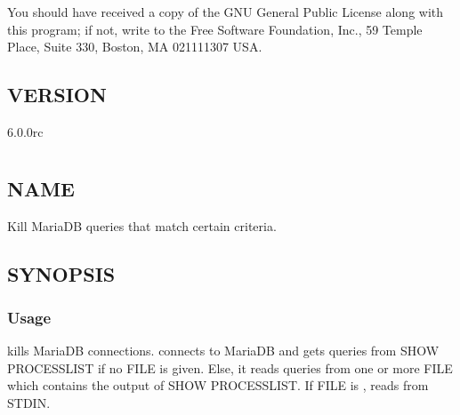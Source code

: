 \documentclass[letterpaper,10pt,english]{sphinxmanual}
\begin{document}
You should have received a copy of the GNU General Public License along with
this program; if not, write to the Free Software Foundation, Inc., 59 Temple
Place, Suite 330, Boston, MA  02111\sphinxhyphen{}1307  USA.


\section{VERSION}
\label{\detokenize{mariadb-iostat:version}}
 6.0.0rc


\chapter{}
\label{\detokenize{mariadb-kill:mariadb-kill}}\label{\detokenize{mariadb-kill::doc}}

\section{NAME}
\label{\detokenize{mariadb-kill:name}}
 \sphinxhyphen{} Kill MariaDB queries that match certain criteria.


\section{SYNOPSIS}
\label{\detokenize{mariadb-kill:synopsis}}

\subsection{Usage}
\label{\detokenize{mariadb-kill:usage}}
\begin{sphinxVerbatim}[commandchars=\\\{\}]
 \PYG{p}{[}\PYG{p}{]} \PYG{p}{[}\PYG{p}{]}
\end{sphinxVerbatim}

 kills MariaDB connections.   connects to MariaDB and gets queries
from SHOW PROCESSLIST if no FILE is given.  Else, it reads queries from one
or more FILE which contains the output of SHOW PROCESSLIST.  If FILE is \sphinxhyphen{},
 reads from STDIN.
\end{document}
